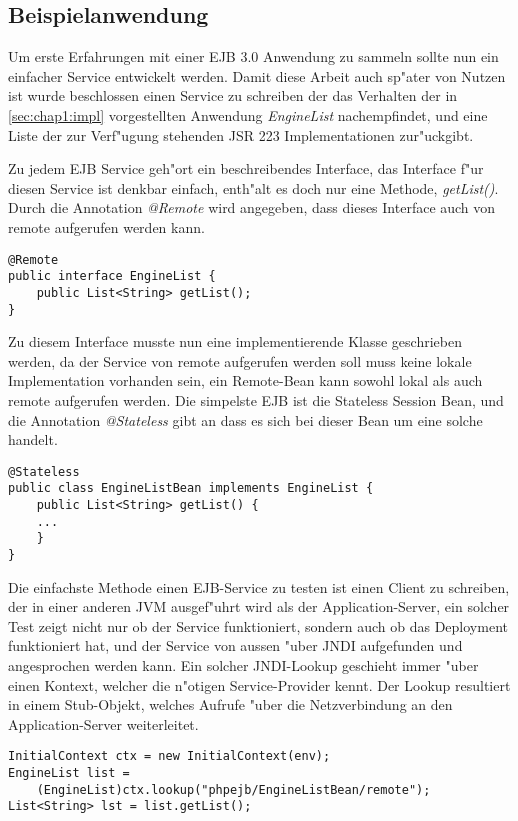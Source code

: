 \subsection{Beispielanwendung}
\label{sec:chap2:infra:example}

Um erste Erfahrungen mit einer EJB 3.0 Anwendung zu sammeln sollte nun ein einfacher Service entwickelt werden.
Damit diese Arbeit auch sp"ater von Nutzen ist wurde beschlossen einen Service zu schreiben der das Verhalten
der in \ref{sec:chap1:impl} vorgestellten Anwendung \emph{EngineList} nachempfindet, und eine Liste der zur Verf"ugung 
stehenden JSR 223 Implementationen zur"uckgibt.

Zu jedem EJB Service geh"ort ein beschreibendes Interface, das Interface f"ur diesen Service ist denkbar einfach,
enth"alt es doch nur eine Methode, \emph{getList()}. Durch die Annotation \emph{@Remote} wird angegeben, dass dieses
Interface auch von remote aufgerufen werden kann.
\begin{lstlisting}[caption=Testservice Interface]
@Remote
public interface EngineList {
    public List<String> getList();
}
\end{lstlisting}
Zu diesem Interface musste nun eine implementierende Klasse geschrieben werden, da der Service von remote aufgerufen
werden soll muss keine lokale Implementation vorhanden sein, ein Remote-Bean kann sowohl lokal als auch remote
aufgerufen werden. Die simpelste EJB ist die Stateless Session Bean, und die Annotation \emph{@Stateless} gibt an
dass es sich bei dieser Bean um eine solche handelt.
\begin{lstlisting}[caption=Testservice Bean]
@Stateless
public class EngineListBean implements EngineList {
    public List<String> getList() {
    ...
    }
}
\end{lstlisting}
Die einfachste Methode einen EJB-Service zu testen ist einen Client zu schreiben, der in einer anderen JVM
ausgef"uhrt wird als der Application-Server, ein solcher Test zeigt nicht nur ob der Service funktioniert,
sondern auch ob das Deployment funktioniert hat, und der Service von aussen "uber JNDI aufgefunden und angesprochen
werden kann. Ein solcher JNDI-Lookup geschieht immer "uber einen Kontext, welcher die n"otigen Service-Provider
kennt. Der Lookup resultiert in einem Stub-Objekt, welches Aufrufe "uber die Netzverbindung an den Application-Server
weiterleitet.
\begin{lstlisting}[caption=Testservice Client]
InitialContext ctx = new InitialContext(env);
EngineList list = 
    (EngineList)ctx.lookup("phpejb/EngineListBean/remote");
List<String> lst = list.getList();
\end{lstlisting}
